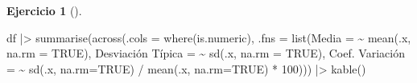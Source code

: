 \documentclass[
  a4paper,
]{scrreport}
\newenvironment{Shaded}{\begin{snugshade}}{\end{snugshade}}
\newcommand{\AttributeTok}[1]{\textcolor[rgb]{0.40,0.45,0.13}{#1}}
\newcommand{\ConstantTok}[1]{\textcolor[rgb]{0.56,0.35,0.01}{#1}}
\newcommand{\DecValTok}[1]{\textcolor[rgb]{0.68,0.00,0.00}{#1}}
\newcommand{\ErrorTok}[1]{\textcolor[rgb]{0.68,0.00,0.00}{#1}}
\newcommand{\FunctionTok}[1]{\textcolor[rgb]{0.28,0.35,0.67}{#1}}
\newcommand{\NormalTok}[1]{\textcolor[rgb]{0.00,0.23,0.31}{#1}}
\newcommand{\OtherTok}[1]{\textcolor[rgb]{0.00,0.23,0.31}{#1}}
\newcommand{\SpecialCharTok}[1]{\textcolor[rgb]{0.37,0.37,0.37}{#1}}
\newcommand{\StringTok}[1]{\textcolor[rgb]{0.13,0.47,0.30}{#1}}
\theoremstyle{definition}
\newtheorem{exercise}{Ejercicio}[chapter]
\theoremstyle{remark}
\begin{document}
\begin{exercise}[]
\begin{enumerate}
\begin{tcolorbox}
\begin{Shaded}
\begin{Highlighting}[]
\NormalTok{df }\SpecialCharTok{|\textgreater{}} \FunctionTok{summarise}\NormalTok{(}\FunctionTok{across}\NormalTok{(}\AttributeTok{.cols =} \FunctionTok{where}\NormalTok{(is.numeric), }\AttributeTok{.fns =} \FunctionTok{list}\NormalTok{(}\AttributeTok{Media =} \SpecialCharTok{\textasciitilde{}} \FunctionTok{mean}\NormalTok{(.x, }\AttributeTok{na.rm =} \ConstantTok{TRUE}\NormalTok{), }\StringTok{\textasciigrave{}}\AttributeTok{Desviación Típica}\StringTok{\textasciigrave{}} \OtherTok{=} \ErrorTok{\textasciitilde{}} \FunctionTok{sd}\NormalTok{(.x, }\AttributeTok{na.rm =} \ConstantTok{TRUE}\NormalTok{), }\StringTok{\textasciigrave{}}\AttributeTok{Coef. Variación}\StringTok{\textasciigrave{}} \OtherTok{=} \ErrorTok{\textasciitilde{}} \FunctionTok{sd}\NormalTok{(.x, }\AttributeTok{na.rm=}\ConstantTok{TRUE}\NormalTok{) }\SpecialCharTok{/} \FunctionTok{mean}\NormalTok{(.x, }\AttributeTok{na.rm=}\ConstantTok{TRUE}\NormalTok{) }\SpecialCharTok{*} \DecValTok{100}\NormalTok{))) }\SpecialCharTok{|\textgreater{}}
    \FunctionTok{kable}\NormalTok{()}
\end{Highlighting}
\end{Shaded}


\end{tcolorbox}
\end{enumerate}
\end{exercise}
\end{document}
